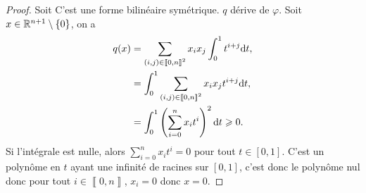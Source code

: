 \documentclass[12pt]{article}
\begin{document}
\begin{proof}
	Soit 
	C'est une forme bilinéaire symétrique. $q$ dérive de $\varphi$. Soit $x\in\mathbb{R}^{n+1}\setminus\left\lbrace0\right\rbrace$, on a 
	\begin{align}
		q(x)
		&=\sum_{(i,j)\in\left\llbracket0,n\right\rrbracket^{2}}x_{i}x_{j}\int_{0}^{1}t^{i+j}\mathrm{d} t,\\
		&=\int_{0}^{1}\sum_{(i,j)\in\left\llbracket0,n\right\rrbracket^{2}}x_ix_jt^{i+j}\mathrm{d} t,\\
		&=\int_{0}^{1}\left(\sum_{i=0}^{n}x_it^{i}\right)^{2}\mathrm{d} t\geqslant0.
	\end{align}
	Si l'intégrale est nulle, alors $\sum_{i=0}^{n}x_it^{i}=0$ pour tout $t\in[0,1]$. C'est un polynôme en $t$ ayant une infinité de racines sur $[0,1]$, c'est donc le polynôme nul donc pour tout $i\in\left\llbracket0,n\right\rrbracket$, $x_i=0$ donc $x=0$.
\end{proof}
\end{document}
